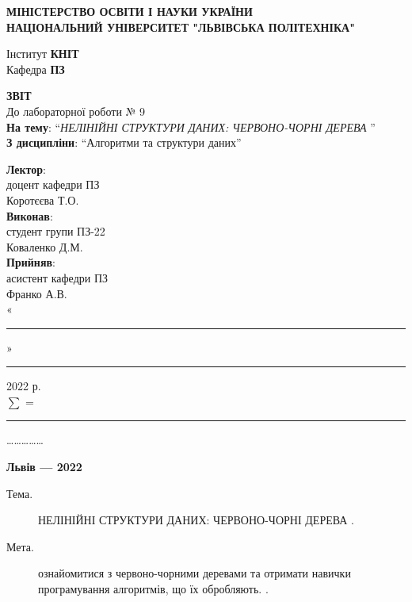 \documentclass{article}
\newcommand\subject{Алгоритми та структури даних}
\newcommand\lecturer{доцент кафедри ПЗ\\Коротєєва Т.О.}
\newcommand\teacher{асистент кафедри ПЗ\\Франко А.В.}
\newcommand\mygroup{ПЗ-22}
\newcommand\lab{9}
\newcommand\theme{НЕЛІНІЙНІ СТРУКТУРИ ДАНИХ: ЧЕРВОНО-ЧОРНІ ДЕРЕВА }
\newcommand\purpose{ознайомитися з червоно-чорними деревами та отримати навички програмування алгоритмів, що їх обробляють. }
\begin{document}
	\begin{normalsize}
		\begin{titlepage}
			\thispagestyle{empty}
			\begin{center}
				\textbf{МІНІСТЕРСТВО ОСВІТИ І НАУКИ УКРАЇНИ\\
					НАЦІОНАЛЬНИЙ УНІВЕРСИТЕТ "ЛЬВІВСЬКА ПОЛІТЕХНІКА"}
			\end{center}
			\begin{flushright}
				Інститут \textbf{КНІТ}\\
				Кафедра \textbf{ПЗ}
			\end{flushright}
			\vspace{200pt}
			\begin{center}
				\textbf{ЗВІТ}\\
				\vspace{10pt}
				До лабораторної роботи № \lab\\
				\textbf{На тему}: “\textit{\theme}”\\
				\textbf{З дисципліни}: “\subject”
			\end{center}
			\vspace{112pt}
			\begin{flushright}
				
				\textbf{Лектор}:\\
				\lecturer\\
				\vspace{28pt}
				\textbf{Виконав}:\\
				
				студент групи \mygroup\\
				Коваленко Д.М.\\
				\vspace{28pt}
				\textbf{Прийняв}:\\
				
				\teacher\\
				
				\vspace{28pt}
				«\rule{1cm}{0.15mm}» \rule{1.5cm}{0.15mm} 2022 р.\\
				$\sum$ = \rule{1cm}{0.15mm}……………\\
				
			\end{flushright}
			\vspace{\fill}
			\begin{center}
				\textbf{Львів — 2022}
			\end{center}
		\end{titlepage}
		
		\begin{description}
			\item[Тема.] \theme.
			\item[Мета.] \purpose.
		\end{description}
		

\end{normalsize}
\end{document}
